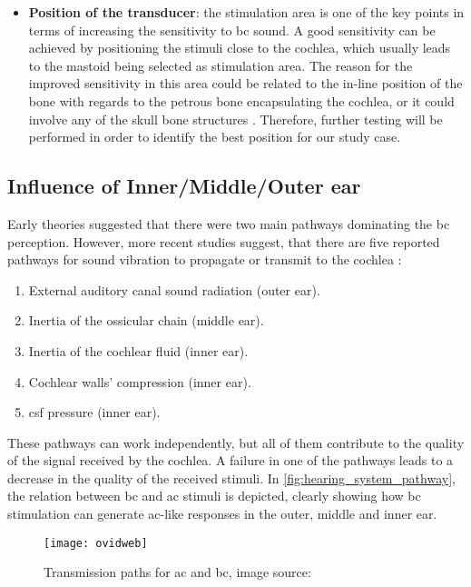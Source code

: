 \begin{itemize}
\item \textbf{Position of the transducer}: the stimulation area is one of the key points in terms of increasing the sensitivity to \gls{bc} sound. A good sensitivity can be achieved by positioning the stimuli close to the cochlea, which usually leads to the mastoid being selected as stimulation area. The reason for the improved sensitivity in this area could be related to the in-line position of the bone with regards to the petrous bone encapsulating the cochlea, or it could involve any of the skull bone structures \citep{puria_2013}. Therefore, further testing will be performed in order to identify the best position for our study case.
\end{itemize}
\subsection{Influence of Inner/Middle/Outer ear}

Early theories suggested that there were two main pathways dominating the \gls{bc} perception. However, more recent studies suggest, that there are five reported pathways for sound vibration to propagate or transmit to the cochlea \citep{zhang_2016}:
\begin{enumerate}
\item External auditory canal sound radiation (outer ear).
\item Inertia of the ossicular chain (middle ear).
\item Inertia of the cochlear fluid (inner ear).
\item Cochlear walls' compression (inner ear).
\item \gls{csf} pressure (inner ear).
\end{enumerate}

These pathways can work independently, but all of them contribute to the quality of the signal received by the cochlea. A failure in one of the pathways leads to a decrease in the quality of the received stimuli. In  \autoref{fig:hearing_system_pathway}, the relation between \gls{bc} and \gls{ac} stimuli is depicted, clearly showing how \gls{bc} stimulation can generate \gls{ac}-like responses in the outer, middle and inner ear.

 \begin{figure}[H]
	\centering
		\texttt{[image: ovidweb]}
		\caption{Transmission paths for \gls{ac} and \gls{bc}, image source:  \citep{stenfelt_2005}}
		\label{fig:hearing_system_pathway}
\end{figure}

